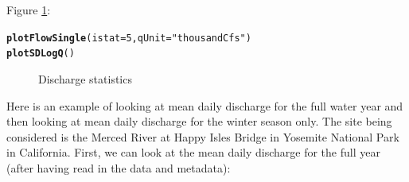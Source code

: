 \documentclass[a4paper,11pt]{article}\usepackage[]{graphicx}\usepackage[]{color}
\makeatletter
\newcommand{\hlnum}[1]{\textcolor[rgb]{0.686,0.059,0.569}{#1}}%
\newcommand{\hlstr}[1]{\textcolor[rgb]{0.192,0.494,0.8}{#1}}%
\newcommand{\hlstd}[1]{\textcolor[rgb]{0.345,0.345,0.345}{#1}}%
\newcommand{\hlkwc}[1]{\textcolor[rgb]{0.333,0.667,0.333}{#1}}%
\newcommand{\hlkwd}[1]{\textcolor[rgb]{0.737,0.353,0.396}{\textbf{#1}}}%
\newenvironment{kframe}{%
 \def\at@end@of@kframe{}%
 \ifinner\ifhmode%
  \def\at@end@of@kframe{\end{minipage}}%
  \begin{minipage}{\columnwidth}%
 \fi\fi%
 \def\FrameCommand##1{\hskip\@totalleftmargin \hskip-\fboxsep
 \colorbox{shadecolor}{##1}\hskip-\fboxsep
     \hskip-\linewidth \hskip-\@totalleftmargin \hskip\columnwidth}%
 \MakeFramed {\advance\hsize-\width
   \@totalleftmargin\z@ \linewidth\hsize
   \@setminipage}}%
 {\par\unskip\endMakeFramed%
 \at@end@of@kframe}
\newenvironment{knitrout}{}{} %
\makeatother
\begin{document}
Figure \ref{fig:plotSingleandSD}:
\begin{knitrout}
\color{fgcolor}\begin{kframe}
\begin{alltt}
\hlkwd{plotFlowSingle}\hlstd{(}\hlkwc{istat}\hlstd{=}\hlnum{5}\hlstd{,}\hlkwc{qUnit}\hlstd{=}\hlstr{"thousandCfs"}\hlstd{)}
\hlkwd{plotSDLogQ}\hlstd{()}
\end{alltt}
\end{kframe}\begin{figure}[]
\caption[Discharge statistics]{Discharge statistics\label{fig:plotSingleandSD}}
\end{figure}


\end{knitrout}


\FloatBarrier

Here is an example of looking at mean daily discharge for the full water year and then looking at mean daily discharge for the winter season only.  The site being considered is the Merced River at Happy Isles Bridge in Yosemite National Park in California.  First, we can look at the mean daily discharge for the full year (after having read in the data and metadata):
\end{document}
